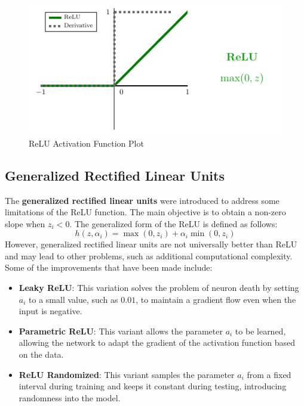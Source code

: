 \vspace{1cm}
\begin{figure}[!htbp]
    \centering
    \includegraphics[scale=2]{tikz/chapter1 - ReLU.pdf}
    \caption{ReLU Activation Function Plot}
\end{figure}


\subsection{Generalized Rectified Linear Units}

The \textbf{generalized rectified linear units} were introduced to address some limitations of the ReLU function. The main objective is to obtain a non-zero slope when \( z_i < 0 \). The generalized form of the ReLU is defined as follows:
$$ h(z, \alpha_i) = \max(0, z_i) + \alpha_i \min(0, z_i) $$
However, generalized rectified linear units are not universally better than ReLU and may lead to other problems, such as additional computational complexity. Some of the improvements that have been made include:
\begin{itemize}     
    \item \textbf{Leaky ReLU}: This variation solves the problem of neuron death by setting \( a_i \) to a small value, such as $0.01$, to maintain a gradient flow even when the input is negative.
    \item \textbf{Parametric ReLU}: This variant allows the parameter \( a_i \) to be learned, allowing the network to adapt the gradient of the activation function based on the data.
    \item \textbf{ReLU Randomized}: This variant samples the parameter \( a_i \) from a fixed interval during training and keeps it constant during testing, introducing randomness into the model.
\end{itemize}

